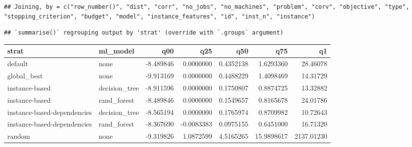 \documentclass[
]{article}
\newenvironment{Shaded}{\begin{snugshade}}{\end{snugshade}}
\newcommand{\DataTypeTok}[1]{\textcolor[rgb]{0.13,0.29,0.53}{#1}}
\newcommand{\FloatTok}[1]{\textcolor[rgb]{0.00,0.00,0.81}{#1}}
\newcommand{\KeywordTok}[1]{\textcolor[rgb]{0.13,0.29,0.53}{\textbf{#1}}}
\newcommand{\NormalTok}[1]{#1}
\newcommand{\OperatorTok}[1]{\textcolor[rgb]{0.81,0.36,0.00}{\textbf{#1}}}
\newcommand{\StringTok}[1]{\textcolor[rgb]{0.31,0.60,0.02}{#1}}
\begin{document}
\begin{verbatim}
## Joining, by = c("row_number()", "dist", "corr", "no_jobs", "no_machines", "problem", "corv", "objective", "type", "stopping_criterion", "budget", "model", "instance_features", "id", "inst_n", "instance")
\end{verbatim}

\begin{Shaded}
\end{Shaded}

\begin{verbatim}
## `summarise()` regrouping output by 'strat' (override with `.groups` argument)
\end{verbatim}

\begin{tabular}{l|l|r|r|r|r|r}
\hline
strat & ml\_model & q00 & q25 & q50 & q75 & q1\\
\hline
default & none & -8.489846 & 0.0000000 & 0.4352138 & 1.6293360 & 28.46078\\
\hline
global\_best & none & -9.913169 & 0.0000000 & 0.4488229 & 1.4098469 & 14.31729\\
\hline
instance-based & decision\_tree & -8.911596 & 0.0000000 & 0.1750807 & 0.8874725 & 13.32882\\
\hline
instance-based & rand\_forest & -8.489846 & 0.0000000 & 0.1549657 & 0.8165678 & 24.01786\\
\hline
instance-based-dependencies & decision\_tree & -8.565194 & 0.0000000 & 0.1765974 & 0.8709982 & 10.72643\\
\hline
instance-based-dependencies & rand\_forest & -8.367690 & -0.0083383 & 0.0975155 & 0.6451000 & 16.71320\\
\hline
random & none & -9.319826 & 1.0872599 & 4.5165265 & 15.9898617 & 2137.01230\\
\hline
\end{tabular}
\end{document}
